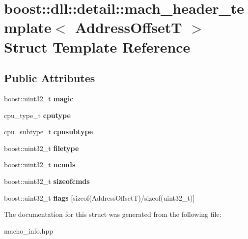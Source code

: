 \hypertarget{a00197}{}\section{boost\+:\+:dll\+:\+:detail\+:\+:mach\+\_\+header\+\_\+template$<$ Address\+OffsetT $>$ Struct Template Reference}
\label{a00197}
\subsection*{Public Attributes}
\begin{DoxyCompactItemize}
\item 
boost\+::uint32\+\_\+t {\bfseries magic}\hypertarget{a00197_ad28ac92758c22ddda4f241518729b4ae}{}\label{a00197_ad28ac92758c22ddda4f241518729b4ae}

\item 
cpu\+\_\+type\+\_\+t {\bfseries cputype}\hypertarget{a00197_a00c3f4a300f9c37586b43e5b779d3e8f}{}\label{a00197_a00c3f4a300f9c37586b43e5b779d3e8f}

\item 
cpu\+\_\+subtype\+\_\+t {\bfseries cpusubtype}\hypertarget{a00197_af2056a14bee03f3f6d9e14d877d541c7}{}\label{a00197_af2056a14bee03f3f6d9e14d877d541c7}

\item 
boost\+::uint32\+\_\+t {\bfseries filetype}\hypertarget{a00197_a3d8ba6fcf26595efb2d1fefc67f2dac9}{}\label{a00197_a3d8ba6fcf26595efb2d1fefc67f2dac9}

\item 
boost\+::uint32\+\_\+t {\bfseries ncmds}\hypertarget{a00197_a69b34374f6b8e4343c07d3d2aab8eaaf}{}\label{a00197_a69b34374f6b8e4343c07d3d2aab8eaaf}

\item 
boost\+::uint32\+\_\+t {\bfseries sizeofcmds}\hypertarget{a00197_ab6f70b88d7344ca1364dc0781e5a9efd}{}\label{a00197_ab6f70b88d7344ca1364dc0781e5a9efd}

\item 
boost\+::uint32\+\_\+t {\bfseries flags} \mbox{[}sizeof(Address\+OffsetT)/sizeof(uint32\+\_\+t)\mbox{]}\hypertarget{a00197_aca56ac96e9d7be8dcd60db13d7ee717c}{}\label{a00197_aca56ac96e9d7be8dcd60db13d7ee717c}

\end{DoxyCompactItemize}


The documentation for this struct was generated from the following file\+:\begin{DoxyCompactItemize}
\item 
macho\+\_\+info.\+hpp\end{DoxyCompactItemize}
